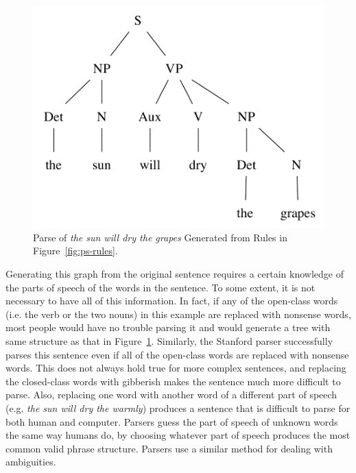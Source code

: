 \documentclass[main.tex]{subfiles}
\begin{document}
\begin{figure}[htbp]
\centering
\includegraphics[scale=0.6]{ps-tree.pdf}
\caption{Parse of \textit{the sun will dry the grapes} Generated from Rules in Figure~\ref{fig:ps-rules}.}
\label{fig:ps-tree}
\end{figure}
Generating this graph from the original sentence requires a certain knowledge of the parts of speech of the words in the sentence. To some extent, it is not necessary to have all of this information. In fact, if any of the open-class words (i.e. the verb or the two nouns) in this example are replaced with nonsense words, most people would have no trouble parsing it and would generate a tree with same structure as that in Figure~\ref{fig:ps-tree}. Similarly, the Stanford parser successfully parses this sentence even if all of the open-class words are replaced with nonsense words. This does not always hold true for more complex sentences, and replacing the closed-class words with gibberish makes the sentence much more difficult to parse. Also, replacing one word with another word of a different part of speech (e.g. \textit{the sun will dry the warmly}) produces a sentence that is difficult to parse for both human and computer. Parsers guess the part of speech of unknown words the same way humans do, by choosing whatever part of speech produces the most common valid phrase structure. Parsers use a similar method for dealing with ambiguities.
\end{document}
